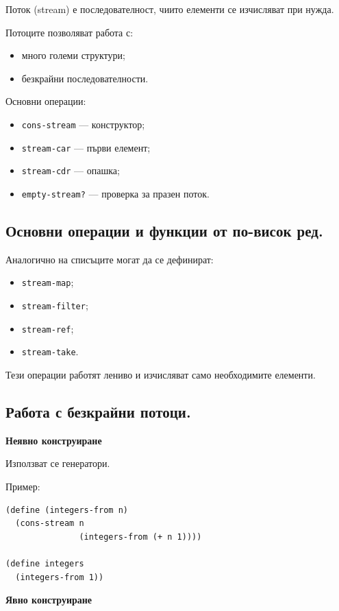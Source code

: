\documentclass{article}
\renewcommand{\\}{\newline}
\begin{document}
Поток (stream) е последователност, чиито елементи се изчисляват при нужда.

Потоците позволяват работа с:
\begin{itemize}
    \item много големи структури;
    \item безкрайни последователности.
\end{itemize}

Основни операции:
\begin{itemize}
    \item \texttt{cons-stream} --- конструктор;
    \item \texttt{stream-car} --- първи елемент;
    \item \texttt{stream-cdr} --- опашка;
    \item \texttt{empty-stream?} --- проверка за празен поток.
\end{itemize}

\subsection{Основни операции и функции от по-висок ред.}

Аналогично на списъците могат да се дефинират:
\begin{itemize}
    \item \texttt{stream-map};
    \item \texttt{stream-filter};
    \item \texttt{stream-ref};
    \item \texttt{stream-take}.
\end{itemize}

Тези операции работят лениво и изчисляват само необходимите елементи.

\subsection{Работа с безкрайни потоци.}

\textbf{Неявно конструиране}

Използват се генератори.

Пример:
\begin{lstlisting}
(define (integers-from n)
  (cons-stream n
               (integers-from (+ n 1))))

(define integers
  (integers-from 1))
\end{lstlisting}

\textbf{Явно конструиране}
\end{document}
